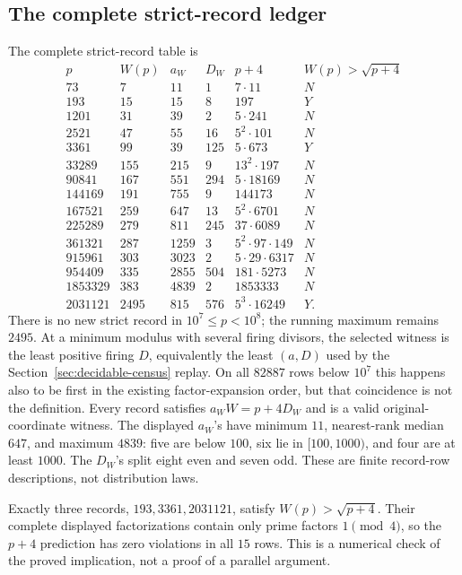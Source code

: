 \documentclass[10pt,reqno]{amsart}
\theoremstyle{definition}
\newcommand{\1}{\mathbf 1}
\begin{document}
\subsection{The complete strict-record ledger}
The complete strict-record table is
\begingroup\scriptsize
\begin{equation}\tag{65.2}
\begin{array}{r|r|r|r|l|c}
p&W(p)&a_W&D_W&p+4&W(p)>\sqrt{p+4}\\ \hline
73&7&11&1&7\cdot11&N\\
193&15&15&8&197&Y\\
1201&31&39&2&5\cdot241&N\\
2521&47&55&16&5^2\cdot101&N\\
3361&99&39&125&5\cdot673&Y\\
33289&155&215&9&13^2\cdot197&N\\
90841&167&551&294&5\cdot18169&N\\
144169&191&755&9&144173&N\\
167521&259&647&13&5^2\cdot6701&N\\
225289&279&811&245&37\cdot6089&N\\
361321&287&1259&3&5^2\cdot97\cdot149&N\\
915961&303&3023&2&5\cdot29\cdot6317&N\\
954409&335&2855&504&181\cdot5273&N\\
1853329&383&4839&2&1853333&N\\
2031121&2495&815&576&5^3\cdot16249&Y.
\end{array}
\end{equation}
\endgroup
There is no new strict record in $10^7\leq p<10^8$; the running maximum
remains $2495$.  At a minimum modulus with several firing divisors, the
selected witness is the least positive firing $D$, equivalently the least
$(a,D)$ used by the Section~\ref{sec:decidable-census} replay.  On all
$82887$ rows below $10^7$ this happens also to be first in the existing
factor-expansion order, but that coincidence is not the definition.  Every
record satisfies $a_WW=p+4D_W$ and is a valid original-coordinate witness.
The displayed $a_W$'s have minimum $11$, nearest-rank median $647$, and
maximum $4839$: five are below $100$, six lie in $[100,1000)$, and four are
at least $1000$.  The $D_W$'s split eight even and seven odd.  These are
finite record-row descriptions, not distribution laws.

Exactly three records, $193,3361,2031121$, satisfy
$W(p)>\sqrt{p+4}$.  Their complete displayed factorizations contain only
prime factors $1\pmod4$, so the $p+4$ prediction has zero violations in all
$15$ rows.  This is a numerical check of the proved implication, not a proof
of a parallel argument.
\end{document}
